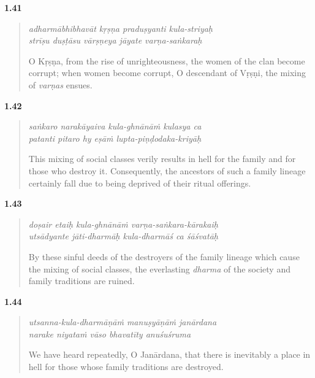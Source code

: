 \par\noindent\textbf{1.41}\par
\begin{verse}
\textit{adharmābhibhavāt kṛṣṇa praduṣyanti kula-striyaḥ} \\
\textit{strīṣu duṣṭāsu vārṣṇeya jāyate varṇa-saṅkaraḥ}

\noindent O Kṛṣṇa, from the rise of unrighteousness, the women of the clan become corrupt; when women become corrupt, O descendant of Vṛṣṇi, the mixing of \textit{varṇas} ensues.
\end{verse}
\par



\par\noindent\textbf{1.42}\par
\begin{verse}
\textit{saṅkaro narakāyaiva kula-ghnānāṁ kulasya ca} \\
\textit{patanti pitaro hy eṣāṁ lupta-piṇḍodaka-kriyāḥ}

\noindent This mixing of social classes verily results in hell for the family and for those who destroy it. Consequently, the ancestors of such a family lineage certainly fall due to being deprived of their ritual offerings.
\end{verse}
\par



\par\noindent\textbf{1.43}\par
\begin{verse}
\textit{doṣair etaiḥ kula-ghnānāṁ varṇa-saṅkara-kārakaiḥ} \\
\textit{utsādyante jāti-dharmāḥ kula-dharmāś ca śāśvatāḥ}

\noindent By these sinful deeds of the destroyers of the family lineage which cause the mixing of social classes, the everlasting \textit{dharma} of the society and family traditions are ruined.
\end{verse}
\par



\par\noindent\textbf{1.44}\par
\begin{verse}
\textit{utsanna-kula-dharmāṇāṁ manuṣyāṇāṁ janārdana} \\
\textit{narake niyataṁ vāso bhavatīty anuśuśruma}

\noindent We have heard repeatedly, O Janārdana, that there is inevitably a place in hell for those whose family traditions are destroyed.
\end{verse}
\par



